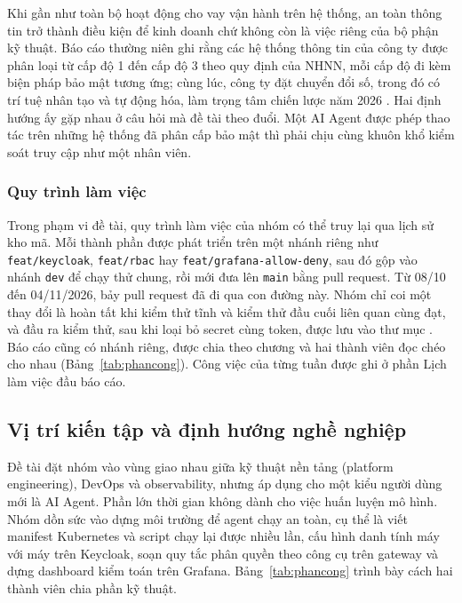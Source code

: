 \documentclass[a4paper]{article}
\begin{document}
Khi gần như toàn bộ hoạt động cho vay vận hành trên hệ thống, an toàn thông tin trở thành điều kiện để kinh doanh chứ không còn là việc riêng của bộ phận kỹ thuật. Báo cáo thường niên ghi rằng các hệ thống thông tin của công ty được phân loại từ cấp độ 1 đến cấp độ 3 theo quy định của NHNN, mỗi cấp độ đi kèm biện pháp bảo mật tương ứng; cùng lúc, công ty đặt chuyển đổi số, trong đó có trí tuệ nhân tạo và tự động hóa, làm trọng tâm chiến lược năm 2026 \parencite{vietcredit_bctn2025}. Hai định hướng ấy gặp nhau ở câu hỏi mà đề tài theo đuổi. Một AI Agent được phép thao tác trên những hệ thống đã phân cấp bảo mật thì phải chịu cùng khuôn khổ kiểm soát truy cập như một nhân viên.

\subsubsection{Quy trình làm việc}

Trong phạm vi đề tài, quy trình làm việc của nhóm có thể truy lại qua lịch sử kho mã. Mỗi thành phần được phát triển trên một nhánh riêng như \texttt{feat/keycloak}, \texttt{feat/rbac} hay \texttt{feat/grafana-allow-deny}, sau đó gộp vào nhánh \texttt{dev} để chạy thử chung, rồi mới đưa lên \texttt{main} bằng pull request. Từ 08/10 đến 04/11/2026, bảy pull request đã đi qua con đường này. Nhóm chỉ coi một thay đổi là hoàn tất khi kiểm thử tĩnh và kiểm thử đầu cuối liên quan cùng đạt, và đầu ra kiểm thử, sau khi loại bỏ secret cùng token, được lưu vào thư mục . Báo cáo cũng có nhánh riêng, được chia theo chương và hai thành viên đọc chéo cho nhau (Bảng~\ref{tab:phancong}). Công việc của từng tuần được ghi ở phần Lịch làm việc đầu báo cáo.

\subsection{Vị trí kiến tập và định hướng nghề nghiệp}

Đề tài đặt nhóm vào vùng giao nhau giữa kỹ thuật nền tảng (platform engineering), DevOps và observability, nhưng áp dụng cho một kiểu người dùng mới là AI Agent. Phần lớn thời gian không dành cho việc huấn luyện mô hình. Nhóm dồn sức vào dựng môi trường để agent chạy an toàn, cụ thể là viết manifest Kubernetes và script chạy lại được nhiều lần, cấu hình danh tính máy với máy trên Keycloak, soạn quy tắc phân quyền theo công cụ trên gateway và dựng dashboard kiểm toán trên Grafana. Bảng~\ref{tab:phancong} trình bày cách hai thành viên chia phần kỹ thuật.
\end{document}
